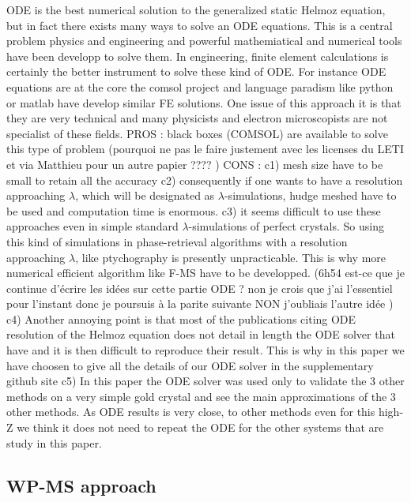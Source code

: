 \documentclass[preprint,12pt,number]{elsarticle}
\begin{document}
ODE is the best numerical solution to the generalized static Helmoz equation, but in fact there exists many ways to solve an ODE equations. This is a central problem physics and engineering and powerful mathemiatical and numerical tools have been developp to solve them. In engineering, finite element calculations is certainly the better instrument to solve these kind of ODE. For instance ODE equations are at the core the comsol project and language paradism like python or matlab have develop similar FE solutions. One issue of this approach it is that they are very technical and many physicists and electron microscopists are not specialist of these fields. 
PROS : black boxes (COMSOL) are available to solve this type of problem (pourquoi ne pas le faire justement avec les licenses du LETI  et via Matthieu pour un autre papier ???? )
CONS : c1) mesh size have to be small to retain all the accuracy c2) consequently if one wants to have a resolution approaching $\lambda$, which will be designated as $\lambda$-simulations, hudge meshed have to be used and computation time is enormous. c3) it seems difficult to use these approaches even in simple standard $\lambda$-simulations of perfect crystals. So using this kind of simulations in phase-retrieval algorithms with a resolution approaching $\lambda$, like ptychography is presently unpracticable. This is why more numerical efficient algorithm like F-MS have to be developped. (6h54 est-ce que je continue d'écrire les idées sur cette partie ODE ? non je crois que j'ai l'essentiel pour l'instant donc je poursuis à la parite suivante NON  j'oubliais l'autre idée ) 
c4) Another annoying point is that most of the publications citing ODE resolution of the Helmoz equation does not detail in length the ODE solver that have and it is then difficult to reproduce their result. This is why in this paper we have choosen to give all the details of our ODE solver in the supplementary github site
c5) In this paper the  ODE solver was used only to validate the 3 other methods on a very simple gold crystal and see the main approximations of the 3 other methods. As ODE results is very close, to other methods even for this high-Z we think it does not need to repeat the ODE for the other systems that are study in this paper. 

\subsection{WP-MS approach}
\label{sec:WP-MSapproach}
\end{document}
